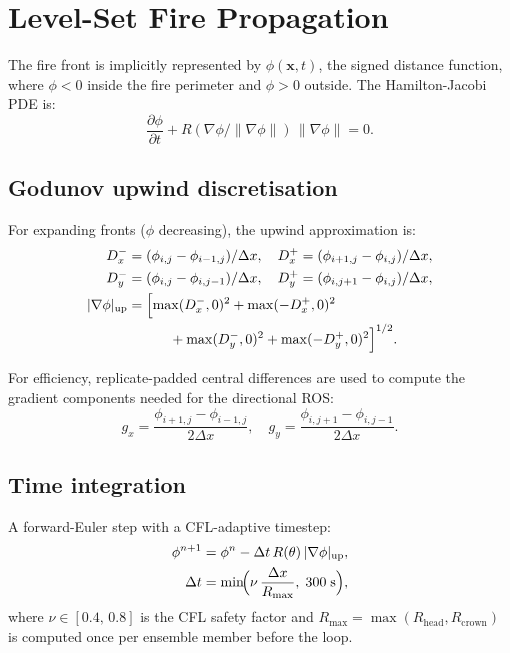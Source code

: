 \documentclass[11pt,twocolumn]{article}
\newcommand{\norm}[1]{\left\lVert#1\right\rVert}
\begin{document}
\section{Level-Set Fire Propagation}
\label{sec:levelset}

The fire front is implicitly represented by $\phi(\mathbf{x},t)$,
the signed distance function, where $\phi<0$ inside the fire perimeter
and $\phi>0$ outside.  The Hamilton-Jacobi PDE is:
\begin{equation}
  \frac{\partial\phi}{\partial t} + R(\nabla\phi/\norm{\nabla\phi})
  \,\norm{\nabla\phi} = 0.\label{eq:HJ}
\end{equation}

\subsection{Godunov upwind discretisation}

For expanding fronts ($\phi$ decreasing), the upwind approximation is:
\begin{align}
  D_x^- &= (\phi_{i,j}-\phi_{i-1,j})/\Delta x,\quad
  D_x^+ = (\phi_{i+1,j}-\phi_{i,j})/\Delta x,\notag\\
  D_y^- &= (\phi_{i,j}-\phi_{i,j-1})/\Delta x,\quad
  D_y^+ = (\phi_{i,j+1}-\phi_{i,j})/\Delta x,\notag\\
  |\nabla\phi|_{\mathrm{up}} &= \Bigl[\max(D_x^-,0)^2+\max(-D_x^+,0)^2\notag\\
                &\qquad\quad+\max(D_y^-,0)^2+\max(-D_y^+,0)^2\Bigr]^{1/2}.
  \label{eq:godunov}
\end{align}

For efficiency, replicate-padded central differences are used to
compute the gradient components needed for the directional ROS:
\begin{equation}
  g_x = \frac{\phi_{i+1,j}-\phi_{i-1,j}}{2\Delta x},\quad
  g_y = \frac{\phi_{i,j+1}-\phi_{i,j-1}}{2\Delta x}.\label{eq:cd}
\end{equation}

\subsection{Time integration}

A forward-Euler step with a CFL-adaptive timestep:
\begin{align}
  \phi^{n+1} &= \phi^n - \Delta t\,R(\theta)\,|\nabla\phi|_{\mathrm{up}},\label{eq:euler}\\
  \Delta t &= \min\!\Bigl(\nu\,\frac{\Delta x}{R_{\max}},\;300\;\text{s}\Bigr),\label{eq:cfl}
\end{align}
where $\nu\in[0.4,\,0.8]$ is the CFL safety factor and
$R_{\max}=\max(R_{\mathrm{head}},R_{\mathrm{crown}})$ is computed
once per ensemble member before the loop.
\end{document}
